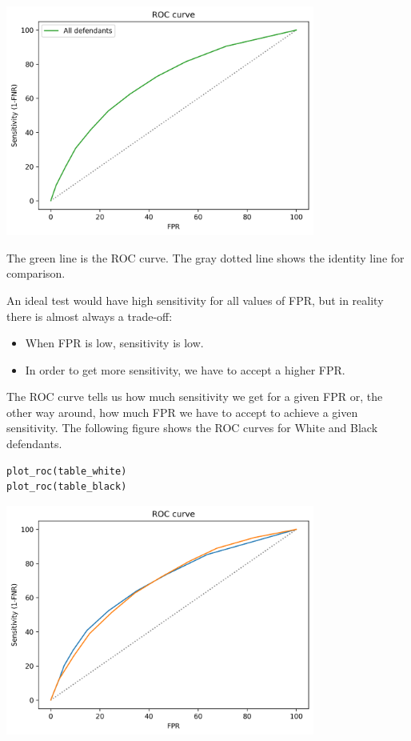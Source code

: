 \begin{center}
\includegraphics[width=4in]{chapters/02_calibration_files/02_calibration_63_0.png}
\end{center}

The green line is the ROC curve. The gray dotted line shows the identity
line for comparison.

An ideal test would have high sensitivity for all values of FPR, but in
reality there is almost always a trade-off:

\begin{itemize}
\item
  When FPR is low, sensitivity is low.
\item
  In order to get more sensitivity, we have to accept a higher FPR.
\end{itemize}

The ROC curve tells us how much sensitivity we get for a given FPR or,
the other way around, how much FPR we have to accept to achieve a given
sensitivity. The following figure shows the ROC curves for White and
Black defendants.

\begin{lstlisting}[]
plot_roc(table_white)
plot_roc(table_black)
\end{lstlisting}

\begin{center}
\includegraphics[width=4in]{chapters/02_calibration_files/02_calibration_65_0.png}
\end{center}

